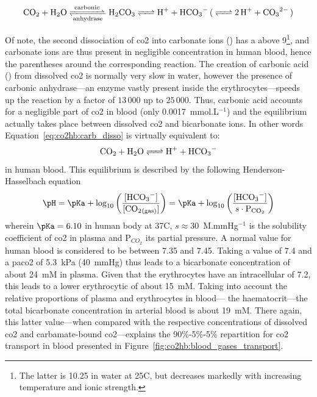 \begin{equation}\label{eq:co2hb:carb_disso}
	\ce{CO2 + H2O <=>T[carbonic][anhydrase] H2CO3 <=> H+ + HCO3- ( <=> 2H+ + CO3^2- )}
\end{equation}

Of note, the second dissociation of \gls{co2} into carbonate ions () has a \pKa{} above 9\footnote{The latter is 10.25 in water at 25{\degree}C, but decreases markedly with increasing temperature and ionic strength\cite{hastings1925, macinnes1933}.}, and carbonate ions are thus present in negligible concentration in human blood, hence the parentheses around the corresponding reaction. The creation of carbonic acid () from dissolved \gls{co2} is normally very slow in water, however the presence of carbonic anhydrase---an enzyme vastly present inside the erythrocytes---speeds up the reaction by a factor of $13\,000$ up to $25\,000$\cite{levitzky2003pulmonary}\cite{geers2000}. Thus, carbonic acid accounts for a negligible part of \gls{co2} in blood (only 0.0017~mmol.L$^{-1}$\cite[Table~10.2]{nunns}) and the equilibrium actually takes place between dissolved \gls{co2} and bicarbonate ions. In other words Equation~\ref{eq:co2hb:carb_disso} is virtually equivalent to:
\begin{equation}\label{eq:co2hb:carb_disso_eq}
	\ce{CO2 + H2O <=> H+ + HCO3-}
\end{equation}
in human blood. This equilibrium is described by the following Henderson-Hasselbach equation
\begin{equation}\label{hh_eq_co2}
	\pH = \pKa + \log_{10} \left( \frac{\ce{[HCO_3^-]}}{\ce{[CO2_{(gas)}]}} \right) = \pKa + \log_{10} \left( \frac{\ce{[HCO_3^-]}}{s \cdot \mathrm{P}_{\ce{CO_2}}} \right)
\end{equation}
wherein $\pKa=6.10$ in human body at 37{\degree}C\cite{messier1975, geers2000}, $s \approx 30$~{\textmu}M.mmHg$^{-1}$ is the solubility coefficient of \gls{co2} in plasma\cite[Table~10.1]{nunns} and P$_{CO_2}$ its partial pressure. A normal \pH{} value for human blood is considered to be between 7.35 and 7.45\cite{rossana}. Taking a \pH{} value of 7.4 and a \gls{paco2} of 5.3~kPa (40~mmHg) thus leads to a bicarbonate concentration \ce{[HCO3^-]} of about 24~mM in plasma. Given that the erythrocytes have an intracellular \pH{} of 7.2\cite{kummerow2000, jensen2004}, this leads to a lower erythrocytic \ce{[HCO3^-]} of about 15~mM. Taking into account the relative proportions of plasma and erythrocytes in blood---\ie{} the haematocrit---the total bicarbonate concentration in arterial blood is about 19~mM. There again, this latter value---when compared with the respective concentrations of dissolved \gls{co2} and carbamate-bound \gls{co2}---explains the 90\%-5\%-5\% repartition for \gls{co2} transport in blood presented in Figure~\ref{fig:co2hb:blood_gases_transport}.

